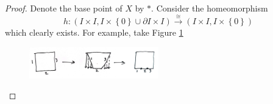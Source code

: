 \documentclass[reqno]{amsart}
\theoremstyle{definition}
\theoremstyle{remark}
\begin{document}
\begin{proof}
    Denote the base point of $X$ by $*$.
    Consider the homeomorphism
    \[
    h \colon \left( I \times I,
    I \times \left\{ 0 \right\} \cup 
\partial I \times I \right) 
\stackrel{\cong}{\to} \left( I \times I, I \times 
\left\{ 0 \right\} \right) 
    \] 
    which clearly exists. For example, take Figure
    \ref{fig:IWIDK01-jpeg}
    \begin{figure}[htpb]
        \centering
        \includegraphics[width=0.5\textwidth]{Figures/IWIDK01.jpeg}
        \caption{}
        \label{fig:IWIDK01-jpeg}
    \end{figure}


\end{proof}
\end{document}
